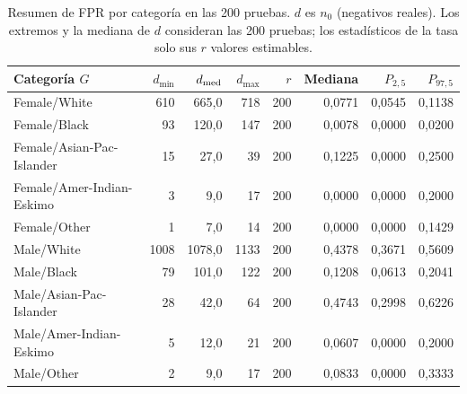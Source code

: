 \documentclass[11pt,a4paper]{article}
\begin{document}
\begin{table}[H]
\centering
\caption[Resumen de FPR por categoría en las 200 pruebas.]{Resumen de FPR por categoría en las 200 pruebas. $d$ es $n_0$ (negativos reales). Los extremos y la mediana de $d$ consideran las 200 pruebas; los estadísticos de la tasa solo sus $r$ valores estimables.}\label{tab:resumenFPR}
\small
\setlength{\tabcolsep}{4pt}
\begin{tabular}{lrrrrrrr}
\toprule
Categoría $G$ & $d_{\min}$ & $d_{\rm med}$ & $d_{\max}$ & $r$ & Mediana & $P_{2,5}$ & $P_{97,5}$ \\
\midrule
Female/White & 610 & 665,0 & 718 & 200 & 0,0771 & 0,0545 & 0,1138 \\
Female/Black & 93 & 120,0 & 147 & 200 & 0,0078 & 0,0000 & 0,0200 \\
Female/Asian-Pac-Islander & 15 & 27,0 & 39 & 200 & 0,1225 & 0,0000 & 0,2500 \\
Female/Amer-Indian-Eskimo & 3 & 9,0 & 17 & 200 & 0,0000 & 0,0000 & 0,2000 \\
Female/Other & 1 & 7,0 & 14 & 200 & 0,0000 & 0,0000 & 0,1429 \\
Male/White & 1008 & 1078,0 & 1133 & 200 & 0,4378 & 0,3671 & 0,5609 \\
Male/Black & 79 & 101,0 & 122 & 200 & 0,1208 & 0,0613 & 0,2041 \\
Male/Asian-Pac-Islander & 28 & 42,0 & 64 & 200 & 0,4743 & 0,2998 & 0,6226 \\
Male/Amer-Indian-Eskimo & 5 & 12,0 & 21 & 200 & 0,0607 & 0,0000 & 0,2000 \\
Male/Other & 2 & 9,0 & 17 & 200 & 0,0833 & 0,0000 & 0,3333 \\
\bottomrule
\end{tabular}
\end{table}
\end{document}
